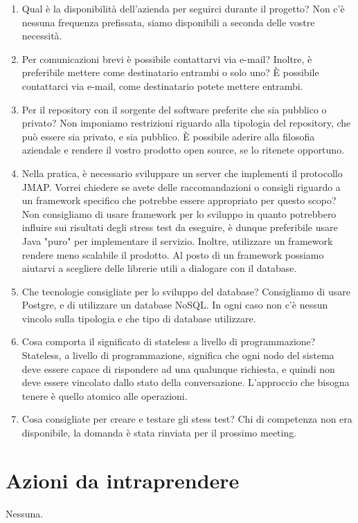 \documentclass[12pt]{article}
\begin{document}
    \begin{enumerate}[label=\textbf{Q\arabic*:}]
    	\item Qual è la disponibilità dell'azienda per seguirci durante il progetto?
    	\answer Non c'è nessuna frequenza prefissata, siamo disponibili a seconda delle vostre necessità.
    	
    	\item Per comunicazioni brevi è possibile contattarvi via e-mail? Inoltre, è preferibile mettere come destinatario entrambi o solo uno?
    	\answer È possibile contattarci via e-mail, come destinatario potete mettere entrambi.
    	
    	\item Per il repository con il sorgente del software preferite che sia pubblico o privato?
    	\answer Non imponiamo restrizioni riguardo alla tipologia del repository, che può essere sia privato, e sia pubblico. È possibile aderire alla filosofia aziendale e rendere il vostro prodotto open source, se lo ritenete opportuno.
    	
    	\item Nella pratica, è necessario sviluppare un server che implementi il protocollo JMAP. Vorrei chiedere se avete delle raccomandazioni o consigli riguardo a un framework specifico che potrebbe essere appropriato per questo scopo?
    	\answer Non consigliamo di usare framework per lo sviluppo in quanto potrebbero influire sui risultati degli stress test da eseguire, è dunque preferibile usare Java "puro" per implementare il servizio. Inoltre, utilizzare un framework rendere meno scalabile il prodotto. Al posto di un framework possiamo aiutarvi a scegliere delle librerie utili a dialogare con il database. 
    	
    	\item Che tecnologie consigliate per lo sviluppo del database?
    	\answer Consigliamo di usare Postgre, e di utilizzare un database NoSQL. In ogni caso non c'è nessun vincolo sulla tipologia e che tipo di database utilizzare.
    	
    	\item Cosa comporta il significato di stateless a livello di programmazione? %
    	\answer Stateless, a livello di programmazione, significa che ogni nodo del sistema deve essere capace di rispondere ad una qualunque richiesta, e quindi non deve essere vincolato dallo stato della conversazione. L'approccio che bisogna tenere è quello atomico alle operazioni. %
    	
    	\item Cosa consigliate per creare e testare gli stess test?
    	\answer Chi di competenza non era disponibile, la domanda è stata rinviata per il prossimo meeting.
    \end{enumerate}
    
    \section{Azioni da intraprendere}
    Nessuna.
\end{document}
